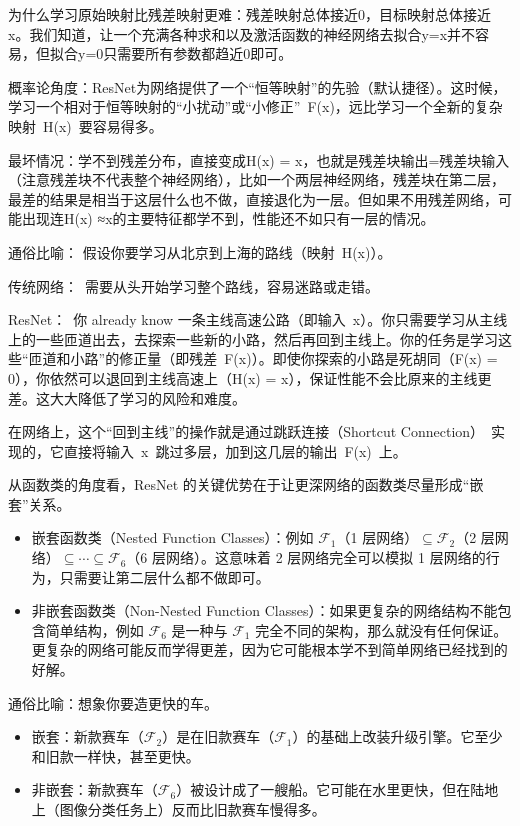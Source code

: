 为什么学习原始映射比残差映射更难：残差映射总体接近0，目标映射总体接近x。我们知道，让一个充满各种求和以及激活函数的神经网络去拟合y=x并不容易，但拟合y=0只需要所有参数都趋近0即可。

概率论角度：ResNet为网络提供了一个``恒等映射''的先验（默认捷径）。这时候，学习一个相对于恒等映射的``小扰动''或``小修正''~F(x)，远比学习一个全新的复杂映射~H(x)~要容易得多。

最坏情况：学不到残差分布，直接变成H(x) = x，也就是残差块输出=残差块输入（注意残差块不代表整个神经网络），比如一个两层神经网络，残差块在第二层，最差的结果是相当于这层什么也不做，直接退化为一层。但如果不用残差网络，可能出现连H(x) ≈x的主要特征都学不到，性能还不如只有一层的情况。

通俗比喻：
假设你要学习从北京到上海的路线（映射~H(x)）。

传统网络：~需要从头开始学习整个路线，容易迷路或走错。

ResNet：~你 already know 一条主线高速公路（即输入~x）。你只需要学习从主线上的一些匝道出去，去探索一些新的小路，然后再回到主线上。你的任务是学习这些``匝道和小路''的修正量（即残差~F(x)）。即使你探索的小路是死胡同（F(x) = 0），你依然可以退回到主线高速上（H(x) = x），保证性能不会比原来的主线更差。这大大降低了学习的风险和难度。

在网络上，这个``回到主线''的操作就是通过跳跃连接（Shortcut Connection）~实现的，它直接将输入~x~跳过多层，加到这几层的输出~F(x)~上。

从函数类的角度看，ResNet 的关键优势在于让更深网络的函数类尽量形成``嵌套''关系。

\begin{itemize}
\tightlist
\item
  嵌套函数类（Nested Function Classes）：例如 \(\mathcal{F}_1\)（1 层网络）\(\subseteq \mathcal{F}_2\)（2 层网络）\(\subseteq \cdots \subseteq \mathcal{F}_6\)（6 层网络）。这意味着 2 层网络完全可以模拟 1 层网络的行为，只需要让第二层什么都不做即可。
\item
  非嵌套函数类（Non-Nested Function Classes）：如果更复杂的网络结构不能包含简单结构，例如 \(\mathcal{F}_6\) 是一种与 \(\mathcal{F}_1\) 完全不同的架构，那么就没有任何保证。更复杂的网络可能反而学得更差，因为它可能根本学不到简单网络已经找到的好解。
\end{itemize}

通俗比喻：想象你要造更快的车。

\begin{itemize}
\tightlist
\item
  嵌套：新款赛车（\(\mathcal{F}_2\)）是在旧款赛车（\(\mathcal{F}_1\)）的基础上改装升级引擎。它至少和旧款一样快，甚至更快。
\item
  非嵌套：新款赛车（\(\mathcal{F}_6\)）被设计成了一艘船。它可能在水里更快，但在陆地上（图像分类任务上）反而比旧款赛车慢得多。
\end{itemize}

